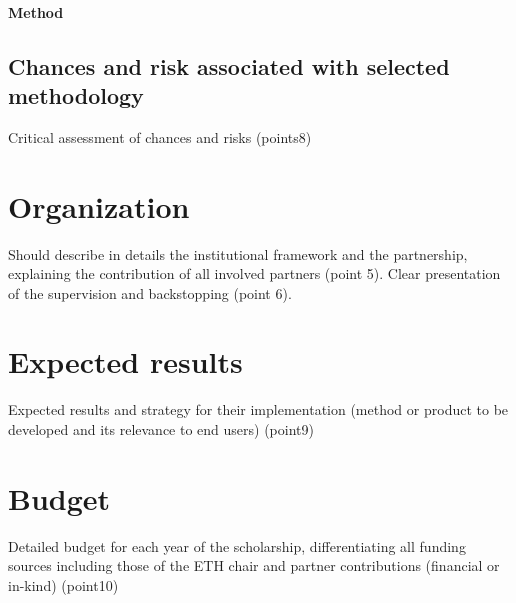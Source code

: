 \documentclass[11pt]{article}
\begin{document}
\paragraph{Method}



\subsection{Chances and risk associated with selected methodology}\label{risk}
Critical assessment of chances and risks (points8)
\section{Organization}\label{organization}
Should describe in details the institutional framework and the partnership, explaining the contribution of all involved partners (point 5). Clear presentation of the supervision and backstopping (point 6).
\section{Expected results}\label{expected}
Expected results and strategy for their implementation (method or product to be developed and its relevance to end users) (point9)
\section{Budget}
Detailed budget for each year of the scholarship, differentiating all funding sources including those of the ETH chair and partner contributions (financial or in-kind) (point10)




\end{document}
